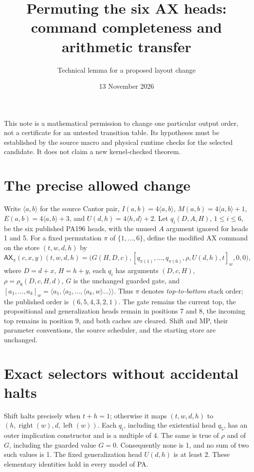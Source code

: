 \documentclass[10pt]{article}
\title{Permuting the six AX heads:\\command completeness and arithmetic transfer}
\author{Technical lemma for a proposed layout change}
\date{13 November 2026}
\newcommand{\Ax}{\mathsf{AX}}
\begin{document}
\maketitle

\noindent
This note is a mathematical permission to change one particular output
order, not a certificate for an untested transition table.  Its hypotheses
must be established by the source macro and physical runtime checks for
the selected candidate.  It does not claim a new kernel-checked theorem.

\section{The precise allowed change}

Write $\langle a,b\rangle$ for the source Cantor pair, $I(a,b)=
4\langle a,b\rangle$, $M(a,b)=4\langle a,b\rangle+1$,
$E(a,b)=4\langle a,b\rangle+3$, and
$U(d,h)=4\langle h,d\rangle+2$.
Let $q_i(D,A,H)$, $1\leq i\leq6$, be the six published PA196
heads, with the unused $A$ argument ignored for heads 1 and 5.
For a fixed permutation $\pi$ of $\{1,\ldots,6\}$, define the
modified AX command on the store $(t,w,d,h)$ by
\[
 \Ax_\pi(c,x,y)(t,w,d,h)
   =\bigl(G(H,D,c),[q_{\pi(1)},\ldots,q_{\pi(6)},
                 \rho,U(d,h),t]_w,0,0\bigr),
\]
where $D=d+x$, $H=h+y$, each $q_i$ has arguments $(D,c,H)$,
$\rho=\rho_8(D,c,H,d)$, $G$ is the unchanged guarded gate, and
$[a_1,\ldots,a_k]_w=\langle a_1,\langle a_2,\ldots,
\langle a_k,w\rangle\ldots\rangle\rangle$.
Thus $\pi$ denotes \emph{top-to-bottom} stack order; the published
order is $(6,5,4,3,2,1)$.  The gate remains the current top,
the propositional and generalization heads remain in positions 7 and 8,
the incoming top remains in position 9, and both caches are cleared.
Shift and MP, their parameter conventions, the source scheduler,
and the starting store are unchanged.

\section{Exact selectors without accidental halts}

Shift halts precisely when $t+h=1$; otherwise it maps
$(t,w,d,h)$ to $(h,\operatorname{right}(w),d,
\operatorname{left}(w))$.  Each $q_i$, including the existential
head $q_5$, has an outer implication constructor and is a multiple
of 4.  The same is true of $\rho$ and of $G$, including the guarded
value $G=0$.  Consequently none is 1, and no sum of two such values
is 1.  The fixed generalization head $U(d,h)$ is at least 2.
These elementary identities hold in every model of PA.
\end{document}
